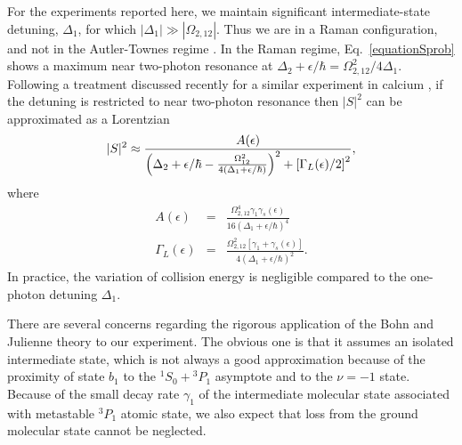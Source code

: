 For the experiments reported here, we maintain significant intermediate-state detuning, $\Delta_1$, for which $|\Delta_1|\gg |\Omega_{2,12}|$. Thus we are in a Raman configuration, and not in the Autler-Townes regime \cite{mmp08}.  In the Raman regime, Eq.\ \ref{equationSprob} shows a maximum near two-photon resonance at $\Delta_2+\epsilon/\hbar =\Omega_{2,12}^2/4\Delta_1$. Following a treatment discussed recently for a similar experiment in calcium \cite{Pachomow2017a}, if the detuning is restricted to near two-photon resonance then $\vert S\vert^2$ can be approximated as a Lorentzian
\begin{eqnarray}
 \vert S\vert^2 \approx {A(\epsilon) \over
 \left(\Delta_2+\epsilon/\hbar-\frac{\Omega_{12}^{2}}{4(\Delta_1+\epsilon/\hbar)}\right)^2+\left[ {\Gamma_L(\epsilon)}/{2}\right]^2},
\end{eqnarray}
where 
\begin{eqnarray}\label{ApproxLorentzianQuantitiesMain}
  A(\epsilon)&=& \frac{\Omega_{2,12}^{4}\gamma_1 \gamma_s(\epsilon)}{16(\Delta_1+\epsilon/\hbar)^4} \\
  \label{ApproxLorentzianQuantities-2Main}
  \Gamma_L(\epsilon)&=& \frac{\Omega_{2,12}^{2}[\gamma_1 +\gamma_s(\epsilon)]}{4(\Delta_1+\epsilon/\hbar)^2}.
\end{eqnarray}
In practice, the variation of collision energy is negligible compared to the one-photon detuning $\Delta_1$. 







There are several concerns regarding the rigorous application of the Bohn and Julienne theory \cite{bju96}  to our experiment. The obvious one is that it assumes an isolated intermediate state, which is not always a good approximation because of the proximity of state $b_1$ to the $^1S_0+{^3P_1}$ asymptote and to the $\nu=-1$ state. Because of the small decay rate $\gamma_1$ of the intermediate molecular state associated with metastable $^3 P_1$ atomic state, we also expect that loss from the ground molecular state cannot be neglected.



